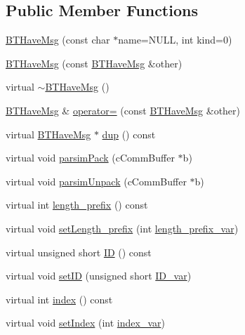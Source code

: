\subsection*{Public Member Functions}
\begin{DoxyCompactItemize}
\item 
\hyperlink{classBTHaveMsg_ad698bdad1ba35798b5e2b3680eccb48a}{B\+T\+Have\+Msg} (const char $\ast$name=N\+U\+L\+L, int kind=0)
\item 
\hyperlink{classBTHaveMsg_ad6fbc684e278c80379a62d5f7323f797}{B\+T\+Have\+Msg} (const \hyperlink{classBTHaveMsg}{B\+T\+Have\+Msg} \&other)
\item 
virtual \hyperlink{classBTHaveMsg_a6bcd9e02e152c9e225bcea3626ca51ba}{$\sim$\+B\+T\+Have\+Msg} ()
\item 
\hyperlink{classBTHaveMsg}{B\+T\+Have\+Msg} \& \hyperlink{classBTHaveMsg_a272493bb474b120d81994a2e5c21f60b}{operator=} (const \hyperlink{classBTHaveMsg}{B\+T\+Have\+Msg} \&other)
\item 
virtual \hyperlink{classBTHaveMsg}{B\+T\+Have\+Msg} $\ast$ \hyperlink{classBTHaveMsg_adb7135f65e0c795d57269863267a06f5}{dup} () const 
\item 
virtual void \hyperlink{classBTHaveMsg_a845818586977d3dea95c9da85f2e8b2d}{parsim\+Pack} (c\+Comm\+Buffer $\ast$b)
\item 
virtual void \hyperlink{classBTHaveMsg_ab616fdeb1fa6886ec873082fd23d786d}{parsim\+Unpack} (c\+Comm\+Buffer $\ast$b)
\item 
virtual int \hyperlink{classBTHaveMsg_a4635462d5b8b5f267f9c34f474c2da06}{length\+\_\+prefix} () const 
\item 
virtual void \hyperlink{classBTHaveMsg_add034dad6ba5390be3a0e282da86ed73}{set\+Length\+\_\+prefix} (int \hyperlink{classBTHaveMsg_a3d41affb383127b621ed0674a69bc77e}{length\+\_\+prefix\+\_\+var})
\item 
virtual unsigned short \hyperlink{classBTHaveMsg_a8cd968be4ae5602f710655a9af0a7188}{I\+D} () const 
\item 
virtual void \hyperlink{classBTHaveMsg_a34d1913993ccca96cfd28a37bdbf3d84}{set\+I\+D} (unsigned short \hyperlink{classBTHaveMsg_a64e557f1acff2867bdd000a2cd71a9d7}{I\+D\+\_\+var})
\item 
virtual int \hyperlink{classBTHaveMsg_ae19164ccec7366fdc1edfed885369a61}{index} () const 
\item 
virtual void \hyperlink{classBTHaveMsg_a3f2f76800dfa7691bcfaf8444bc6e50a}{set\+Index} (int \hyperlink{classBTHaveMsg_a0cc4163cbb7ced674444b8fbc897327f}{index\+\_\+var})
\end{DoxyCompactItemize}

